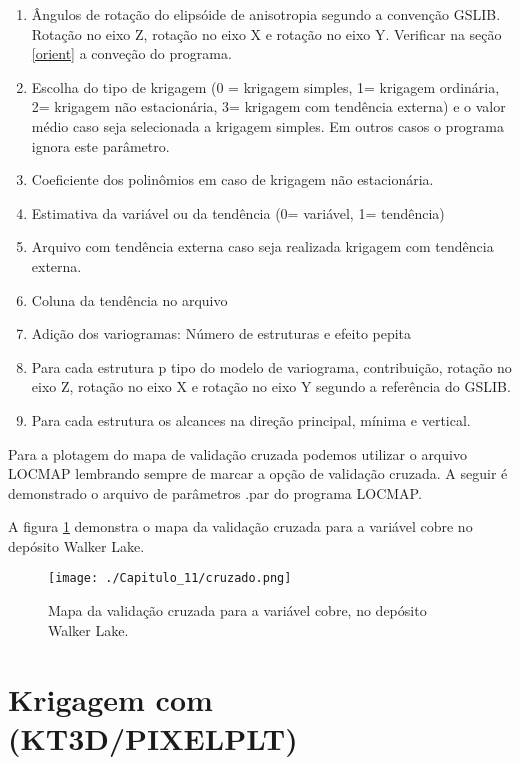 \begin{enumerate}
	\item Ângulos de rotação do elipsóide de anisotropia segundo a convenção GSLIB. Rotação no eixo Z, rotação no eixo X e rotação no eixo Y. Verificar na seção \ref{orient} a conveção do programa. 
	\item Escolha do tipo de krigagem (0 = krigagem simples, 1= krigagem ordinária, 2= krigagem não estacionária, 3= krigagem com tendência externa) e o valor médio caso seja selecionada a krigagem simples. Em outros casos o programa ignora este parâmetro. 
	\item Coeficiente dos polinômios em caso de krigagem não estacionária. 
	\item Estimativa da variável ou da tendência (0= variável, 1= tendência)
	\item Arquivo com tendência externa caso seja realizada krigagem com tendência externa.
	\item Coluna da tendência no arquivo
	\item Adição dos variogramas: Número de estruturas e efeito pepita 
	\item Para cada estrutura p tipo do modelo de variograma, contribuição, rotação no eixo Z, rotação no eixo X e rotação no eixo Y segundo a referência do GSLIB. 
	\item Para cada estrutura os alcances na direção principal, mínima e vertical.
	
\end{enumerate}

Para a plotagem do mapa de validação cruzada podemos utilizar o arquivo LOCMAP lembrando sempre de marcar a opção de validação cruzada. A seguir é demonstrado o arquivo de parâmetros .par do programa LOCMAP. 

\begin{small}
	\begingroup
	
	\endgroup
\end{small}

A figura \ref{cruzado_gslib} demonstra o mapa da validação cruzada para a variável cobre no depósito Walker Lake. 

\FloatBarrier
\begin{figure}[h]
	\centering
	\texttt{[image: ./Capitulo\_11/cruzado.png]}	
	\caption{ Mapa da validação cruzada para a variável cobre, no depósito Walker Lake.}
	\label{cruzado_gslib}
\end{figure}
\FloatBarrier

\section{Krigagem com (KT3D/PIXELPLT)}

